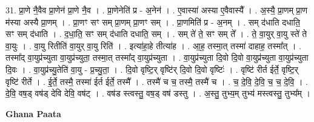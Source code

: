 \documentclass[17pt]{extarticle}
\begin{document}
31. प्रा॒णे नै॒वैव प्रा॒णेन॑ प्रा॒णे नै॒व । . प्रा॒णेनेति॑ प्र - अ॒नेन॑ । . ए॒वास्या॑ अस्या ए॒वैवास्यै᳚ । . अ॒स्यै॒ प्रा॒णम् प्रा॒ण म॑स्या अस्यै प्रा॒णम् । . प्रा॒णꣳ सꣳ सम् प्रा॒णम् प्रा॒णꣳ सम् । . प्रा॒णमिति॑ प्र - अ॒नम् । . सम् द॑धाति दधाति॒ सꣳ सम् द॑धाति । . द॒धा॒ति॒ सꣳ सम् द॑धाति दधाति॒ सम् । . सम् ते॑ ते॒ सꣳ सम् ते᳚ । . ते॒ वा॒युर् वा॒यु स्ते॑ ते वा॒युः । . वा॒यु रितीति॑ वा॒युर् वा॒यु रिति॑ । . इत्या॑हा॒हे तीत्या॑ह । . आ॒ह॒ तस्मा॒त् तस्मा॑ दाहाह॒ तस्मा᳚त् । . तस्मा᳚द् वा॒युप्र॑च्युता वा॒युप्र॑च्युता॒ तस्मा॒त् तस्मा᳚द् वा॒युप्र॑च्युता । . वा॒युप्र॑च्युता दि॒वो दि॒वो वा॒युप्र॑च्युता वा॒युप्र॑च्युता दि॒वः । . वा॒युप्र॑च्यु॒तेति॑ वा॒यु - प्र॒च्यु॒ता॒ । . दि॒वो वृष्टि॒र् वृष्टि॑र् दि॒वो दि॒वो वृष्टिः॑ । . वृष्टि॑ रीर्त ईर्ते॒ वृष्टि॒र् वृष्टि॑ रीर्ते । . ई॒र्ते॒ तस्मै॒ तस्मा॑ ईर्त ईर्ते॒ तस्मै᳚ । . तस्मै॑ च च॒ तस्मै॒ तस्मै॑ च । . च॒ दे॒वि॒ दे॒वि॒ च॒ च॒ दे॒वि॒ । . दे॒वि॒ वष॒ड् वष॑ड् देवि देवि॒ वष॑ट् । . वष॑ड स्त्वस्तु॒ वष॒ड् वष॑ डस्तु । . अ॒स्तु॒ तुभ्य॒म् तुभ्य॑ मस्त्वस्तु॒ तुभ्य᳚म् । \newline

\textbf{Ghana Paata } \newline
\end{document}
